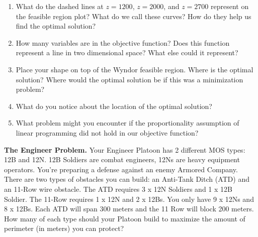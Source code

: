 \documentclass[12pt]{article}
\begin{document}
\begin{minipage}[c]{0.6\textwidth}
\end{minipage}

\newpage
\begin{enumerate}
    \item What do the dashed lines at $z=1200$, $z=2000$, and $z=2700$ represent on the feasible region plot? What do we call these curves? How do they help us find the optimal solution? \vfill
    \item How many variables are in the objective function? Does this function represent a line in two dimensional space? What else could it represent?\vfill
    \item Place your shape on top of the Wyndor feasible region. Where is the optimal solution? Where would the optimal solution be if this was a minimization problem? \vfill
    \item What do you notice about the location of the optimal solution? \vfill
    \item What problem might you encounter if the proportionality assumption of linear programming did not hold in our objective function? \vfill
\end{enumerate}
\newpage
\noindent \textbf{The Engineer Problem.} Your Engineer Platoon has 2 different MOS types: 12B and 12N. 12B Soldiers are combat engineers, 12Ns are heavy equipment operators. You’re preparing a defense against an enemy Armored Company. There are two types of obstacles you can build: an Anti-Tank Ditch (ATD) and an 11-Row wire obstacle. The ATD requires 3 x 12N Soldiers and 1 x 12B Soldier. The 11-Row requires 1 x 12N and 2 x 12Bs. You only have 9 x 12Ns and 8 x 12Bs. Each ATD will span 300 meters and the 11 Row will block 200 meters. How many of each type should your Platoon build to maximize the amount of perimeter (in meters) you can protect?\\
\end{document}
